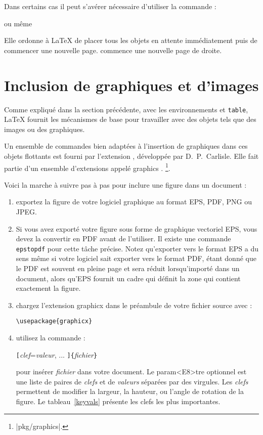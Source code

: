 Dans certains cas il peut s'avérer nécessaire d'utiliser la commande :
\begin{lscommand}
 ou même 
\end{lscommand}
Elle ordonne à \LaTeX{} de placer tous les objets en attente
immédiatement puis de commencer une nouvelle
page.  commence une nouvelle page de droite.

\section{Inclusion de graphiques et d'images} \label{eps}

Comme expliqué dans la section précédente,
avec les environnements  et \texttt{table}, \LaTeX{}
fournit les mécanismes de base pour travailler avec des objets tels que
des images ou des graphiques.

Un ensemble de commandes bien adaptées à l'insertion de graphiques dans ces objets flottants est
fourni par l'extension , développée par D.~P.~Carlisle. Elle
fait partie d'un ensemble d'extensions appelé \og graphics \fg{}.
\footnote{\CTAN|pkg/graphics|.}.

Voici la marche à suivre pas à pas pour inclure une
figure dans un document :

\begin{enumerate}
\item exportez la figure de votre logiciel graphique au format EPS, PDF, PNG ou JPEG.
\item Si vous avez exporté votre figure sous forme de graphique
  vectoriel EPS, vous devez la convertir en PDF avant de
  l'utiliser. Il existe une commande \texttt{epstopdf} pour cette
  tâche précise. Notez qu'exporter vers le format EPS a du sens même
  si votre logiciel sait exporter vers le format PDF, étant donné que
  le PDF est souvent en pleine page et sera réduit lorsqu'importé dans
  un document, alors qu'EPS fournit un cadre qui définit la zone qui
  contient exactement la figure.
\item chargez l'extension \textsf{graphicx} dans le préambule de votre
      fichier source avec :
\begin{lscommand}
\verb|\usepackage{graphicx}|
\end{lscommand}
\item utilisez la commande :
\begin{lscommand}
\verb|[|\emph{clef}=\emph{valeur}, ... \verb|]{|\emph{fichier}\verb|}|
\end{lscommand}
\noindent pour insérer \emph{fichier} dans votre document. Le param<E8>tre
optionnel est une liste de paires de \emph{clefs} et de \emph{valeurs}
séparées par des virgules. Les \emph{clefs} permettent de modifier la
largeur, la hauteur, ou l'angle de rotation de la figure. Le
tableau~\ref{keyvals} présente les clefs les plus importantes.
\end{enumerate}

